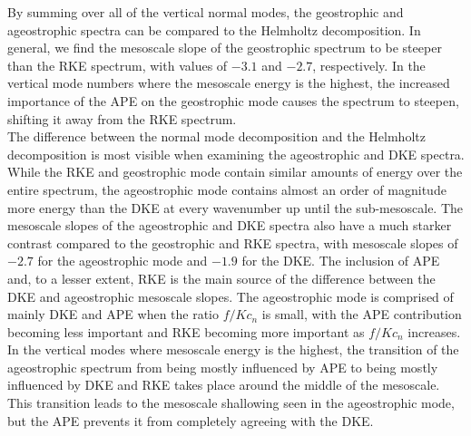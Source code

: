 By summing over all of the vertical normal modes, the geostrophic and ageostrophic spectra can be compared to the Helmholtz decomposition. In general, we find the mesoscale slope of the geostrophic spectrum to be steeper than the RKE spectrum, with values of $-3.1$ and $-2.7$, respectively. In the vertical mode numbers where the mesoscale energy is the highest, the increased importance of the APE on the geostrophic mode causes the spectrum to steepen, shifting it away from the RKE spectrum.\\

The difference between the normal mode decomposition and the Helmholtz decomposition is most visible when examining the ageostrophic and DKE spectra. While the RKE and geostrophic mode contain similar amounts of energy over the entire spectrum, the ageostrophic mode contains almost an order of magnitude more energy than the DKE at every wavenumber up until the sub-mesoscale. The mesoscale slopes of the ageostrophic and DKE spectra also have a much starker contrast compared to the geostrophic and RKE spectra, with mesoscale slopes of $-2.7$ for the ageostrophic mode and $-1.9$ for the DKE. The inclusion of APE and, to a lesser extent, RKE is the main source of the difference between the DKE and ageostrophic mesoscale slopes. The ageostrophic mode is comprised of mainly DKE and APE when the ratio $f/Kc_n$ is small, with the APE contribution becoming less important and RKE becoming more important as $f/Kc_n$ increases. In the vertical modes where mesoscale energy is the highest, the transition of the ageostrophic spectrum from being mostly influenced by APE to being mostly influenced by DKE and RKE takes place around the middle of the mesoscale. This transition leads to the mesoscale shallowing seen in the ageostrophic mode, but the APE prevents it from completely agreeing with the DKE.\\

